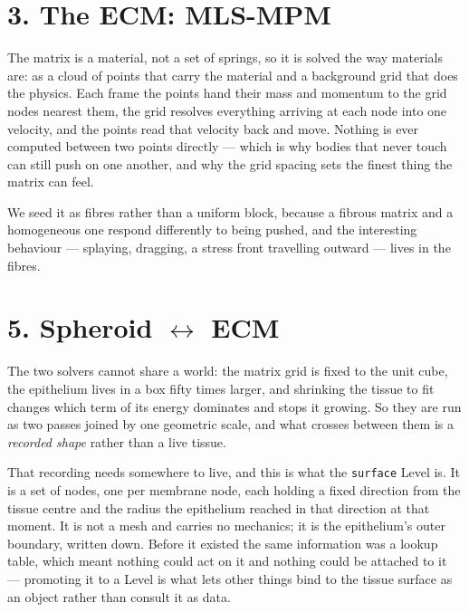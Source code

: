 \documentclass[10pt,a4paper]{article}
\newcommand{\op}[1]{\texttt{#1}}
\begin{document}
\section*{3.\; The ECM: MLS-MPM}

The matrix is a material, not a set of springs, so it is solved the way materials are: as a cloud of
points that carry the material and a background grid that does the physics. Each frame the points hand
their mass and momentum to the grid nodes nearest them, the grid resolves everything arriving at each
node into one velocity, and the points read that velocity back and move. Nothing is ever computed
between two points directly --- which is why bodies that never touch can still push on one another, and
why the grid spacing sets the finest thing the matrix can feel.

We seed it as fibres rather than a uniform block, because a fibrous matrix and a homogeneous one respond
differently to being pushed, and the interesting behaviour --- splaying, dragging, a stress front
travelling outward --- lives in the fibres.

\section*{5.\; Spheroid $\leftrightarrow$ ECM}

The two solvers cannot share a world: the matrix grid is fixed to the unit cube, the epithelium lives in
a box fifty times larger, and shrinking the tissue to fit changes which term of its energy dominates and
stops it growing. So they are run as two passes joined by one geometric scale, and what crosses between
them is a \emph{recorded shape} rather than a live tissue.

That recording needs somewhere to live, and this is what the \op{surface} Level is. It is a set of
nodes, one per membrane node, each holding a fixed direction from the tissue centre and the radius the
epithelium reached in that direction at that moment. It is not a mesh and carries no mechanics; it is
the epithelium's outer boundary, written down. Before it existed the same information was a lookup
table, which meant nothing could act on it and nothing could be attached to it --- promoting it to a
Level is what lets other things bind to the tissue surface as an object rather than consult it as data.
\end{document}
